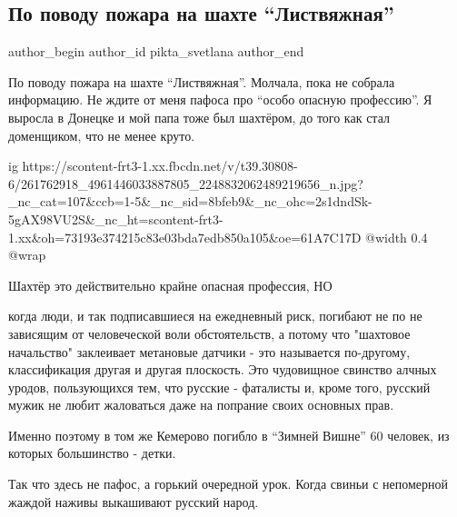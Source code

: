  
 
 
 
 
 
\subsection{По поводу пожара на шахте \enquote{Листвяжная}}
\label{sec:28_11_2021.fb.pikta_svetlana.1.pozhar_shahta_listvjazhnaja}
 
\ifcmt
 author_begin
   author_id pikta_svetlana
 author_end
\fi

По поводу пожара на шахте \enquote{Листвяжная}. Молчала, пока не собрала информацию.
Не ждите от меня пафоса про \enquote{особо опасную профессию}. Я выросла в Донецке и
мой папа тоже был шахтёром, до того как стал доменщиком, что не менее круто.

\ifcmt
  ig https://scontent-frt3-1.xx.fbcdn.net/v/t39.30808-6/261762918_4961446033887805_2248832062489219656_n.jpg?_nc_cat=107&ccb=1-5&_nc_sid=8bfeb9&_nc_ohc=2s1dndSk-5gAX98VU2S&_nc_ht=scontent-frt3-1.xx&oh=73193e374215c83e03bda7edb850a105&oe=61A7C17D
  @width 0.4
  @wrap 
\fi

Шахтёр это действительно крайне опасная профессия, НО 

когда люди, и так подписавшиеся на ежедневный риск, погибают не по не зависящим
от человеческой воли  обстоятельств, а потому что "шахтовое начальство"
заклеивает метановые датчики - это называется по-другому, классификация другая
и другая плоскость. Это чудовищное свинство алчных уродов, пользующихся тем,
что русские - фаталисты и, кроме того, русский мужик не любит жаловаться даже
на попрание своих основных прав.  

Именно поэтому в том же Кемерово погибло в \enquote{Зимней Вишне} 60 человек, из
которых большинство - детки.

Так что здесь не пафос, а горький очередной урок. Когда свиньи с непомерной
жаждой наживы выкашивают русский народ.

